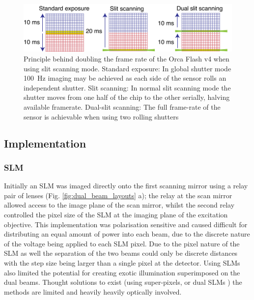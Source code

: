 \begin{figure}
  \centering
  \includegraphics{dual_slit_scanning}
  \caption{
  Principle behind doubling the frame rate of the Orca Flash v4 when using slit scanning mode.
  Standard exposure: In global shutter mode \SI{100}{\hertz} imaging may be achieved as each side of the sensor rolls an independent shutter.
  Slit scanning: In normal slit scanning mode the shutter moves from one half of the chip to the other serially, halving available framerate.
  Dual-slit scanning:
  The full frame-rate of the sensor is achievable when using two rolling shutters
  }
  \label{fig:dual_slit_scanning}
\end{figure}

\subsection{Implementation}
\subsubsection{SLM}
Initially an SLM was imaged directly onto the first scanning mirror using a relay pair of lenses (Fig. \ref{fig:dual_beam_layouts} a); the relay at the scan mirror allowed access to the image plane of the scan mirror, whilst the second relay controlled the pixel size of the SLM at the imaging plane of the excitation objective.
This implementation was polarisation sensitive and caused difficult for distributing an equal amount of power into each beam, due to the discrete nature of the voltage being applied to each SLM pixel.
Due to the pixel nature of the SLM as well the separation of the two beams could only be discrete distances with the step size being larger than a single pixel at the detector.
Using SLMs also limited the potential for creating exotic illumination superimposed on the dual beams.
Thought solutions to exist (using super-pixels\cite{}, or dual SLMs \cite{}) the methods are limited and heavily heavily optically involved.

